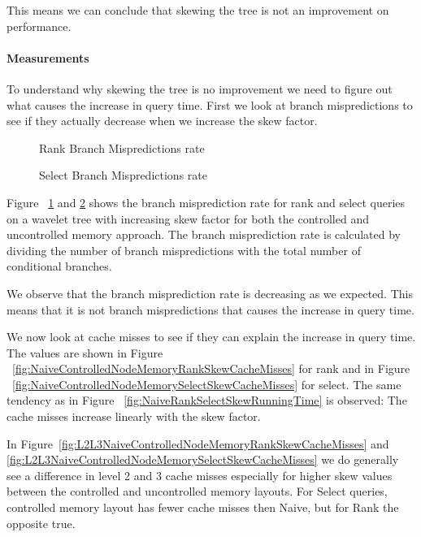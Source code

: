 This means we can conclude that skewing the tree is not an improvement on performance.

\paragraph{Measurements}
To understand why skewing the tree is no improvement we need to figure out what causes the increase in query time. 
First we look at branch mispredictions to see if they actually decrease when we increase the skew factor.%
\begin{figure}
\caption{Rank Branch Mispredictions rate}
\label{fig:NaiveVsControlledNodeMemorySkewRankQueryBMrate}

\end{figure}%
\begin{figure}
\caption{Select Branch Mispredictions rate}
\label{fig:NaiveVsControlledNodeMemorySkewSelectQueryBMrate}

\end{figure}
 
Figure ~\ref{fig:NaiveVsControlledNodeMemorySkewRankQueryBMrate} and \ref{fig:NaiveVsControlledNodeMemorySkewSelectQueryBMrate} shows the branch misprediction rate for rank and select queries on a wavelet tree with increasing skew factor for both the controlled and uncontrolled memory approach. 
The branch misprediction rate is calculated by dividing the number of branch mispredictions with the total number of conditional branches.

We observe that the branch misprediction rate is decreasing as we expected. 
This means that it is not branch mispredictions that causes the increase in query time. 

We now look at cache misses to see if they can explain the increase in query time. 
The values are shown in Figure ~\ref{fig:NaiveControlledNodeMemoryRankSkewCacheMisses} for rank and in Figure ~\ref{fig:NaiveControlledNodeMemorySelectSkewCacheMisses} for select.
The same tendency as in Figure ~\ref{fig:NaiveRankSelectSkewRunningTime} is observed: 
The cache misses increase linearly with the skew factor.

In Figure~\ref{fig:L2L3NaiveControlledNodeMemoryRankSkewCacheMisses} and \ref{fig:L2L3NaiveControlledNodeMemorySelectSkewCacheMisses} we do generally see a difference in level 2 and 3 cache misses especially for higher skew values between the controlled and uncontrolled memory layouts. For Select queries, controlled memory layout has fewer cache misses then Naive, but for Rank the opposite true.

